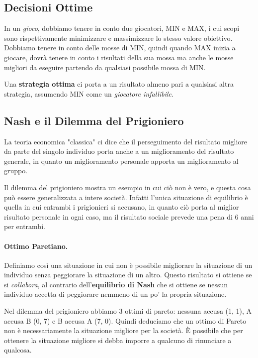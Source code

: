     \subsection{Decisioni Ottime}
        In un \textit{gioco}, dobbiamo tenere in conto due giocatori, MIN e MAX, i cui scopi sono rispettivamente minimizzare e massimizzare lo stesso valore obiettivo. Dobbiamo tenere in conto delle mosse di MIN, quindi quando MAX inizia a giocare, dovrà tenere in conto i risultati della sua mossa ma anche le mosse migliori da eseguire partendo da qualsiasi possibile mossa di MIN.
        
        Una \textbf{strategia ottima} ci porta a un risultato almeno pari a qualsiasi altra strategia, assumendo MIN come un \textit{giocatore infallibile}.
        
    \subsection{Nash e il Dilemma del Prigioniero}
        La teoria economica "classica" ci dice che il perseguimento del risultato migliore da parte del singolo individuo porta anche a un miglioramento del risultato generale, in quanto un miglioramento personale apporta un miglioramento al gruppo.
        
        Il dilemma del prigioniero mostra un esempio in cui ciò non è vero, e questa cosa può essere generalizzata a intere società. Infatti l'unica situazione di equilibrio è quella in cui entrambi i prigionieri si accusano, in quanto ciò porta al miglior risultato personale in ogni caso, ma il risultato sociale prevede una pena di 6 anni per entrambi.
        
        \paragraph{Ottimo Paretiano.} Definiamo così una situazione in cui non è possibile migliorare la situazione di un individuo senza peggiorare la situazione di un altro. Questo risultato si ottiene se si \textit{collabora}, al contrario dell'\textbf{equilibrio di Nash} che si ottiene se nessun individuo accetta di peggiorare nemmeno di un po' la propria situazione.
        
        Nel dilemma del prigioniero abbiamo 3 ottimi di pareto: nessuna accusa (1, 1), A accusa B (0, 7) e B accusa A (7, 0). Quindi deduciamo che un ottimo di Pareto non è necessariamente la situazione migliore per la società. È possibile che per ottenere la situazione migliore si debba imporre a qualcuno di rinunciare a qualcosa.
        
